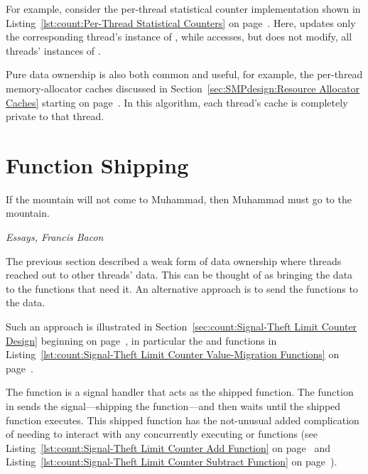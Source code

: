 For example, consider the per-thread statistical counter implementation
shown in
Listing~\ref{lst:count:Per-Thread Statistical Counters} on
page~\pageref{lst:count:Per-Thread Statistical Counters}.
Here,  updates only the corresponding thread's
instance of ,
while  accesses, but does not modify, all
threads' instances of .

\QuickQuizEnd

Pure data ownership is also both common and useful, for example, the
per-thread memory-allocator caches discussed in
Section~\ref{sec:SMPdesign:Resource Allocator Caches}
starting on
page~\pageref{sec:SMPdesign:Resource Allocator Caches}.
In this algorithm, each thread's cache is completely private to that
thread.

\section{Function Shipping}
\label{sec:owned:Function Shipping}
%
\epigraph{If the mountain will not come to Muhammad, then Muhammad must
	  go to the mountain.}
	 {\emph{Essays, Francis Bacon}}

The previous section described a weak form of data ownership where
threads reached out to other threads' data.
This can be thought of as bringing the data to the functions that
need it.
An alternative approach is to send the functions to the data.

Such an approach is illustrated in
Section~\ref{sec:count:Signal-Theft Limit Counter Design}
beginning on
page~\pageref{sec:count:Signal-Theft Limit Counter Design},
in particular the  and
 functions in
Listing~\ref{lst:count:Signal-Theft Limit Counter Value-Migration Functions}
on
page~\pageref{lst:count:Signal-Theft Limit Counter Value-Migration Functions}.

The  function is a signal handler that
acts as the shipped function.
The  function in 
sends the signal---shipping the function---and then waits until
the shipped function executes.
This shipped function has the not-unusual added complication of
needing to interact with any concurrently executing 
or  functions (see
Listing~\ref{lst:count:Signal-Theft Limit Counter Add Function}
on
page~\pageref{lst:count:Signal-Theft Limit Counter Add Function} and
Listing~\ref{lst:count:Signal-Theft Limit Counter Subtract Function}
on
page~\pageref{lst:count:Signal-Theft Limit Counter Subtract Function}).

